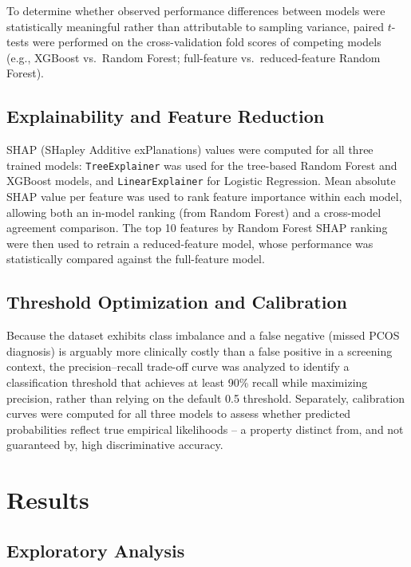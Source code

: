\documentclass[conference]{IEEEtran}
\begin{document}
To determine whether observed performance differences between models were statistically meaningful rather than attributable to sampling variance, paired $t$-tests were performed on the cross-validation fold scores of competing models (e.g., XGBoost vs.\ Random Forest; full-feature vs.\ reduced-feature Random Forest).

\subsection{Explainability and Feature Reduction}

SHAP (SHapley Additive exPlanations) values \cite{lundberg2017} were computed for all three trained models: \texttt{TreeExplainer} was used for the tree-based Random Forest and XGBoost models, and \texttt{LinearExplainer} for Logistic Regression. Mean absolute SHAP value per feature was used to rank feature importance within each model, allowing both an in-model ranking (from Random Forest) and a cross-model agreement comparison. The top 10 features by Random Forest SHAP ranking were then used to retrain a reduced-feature model, whose performance was statistically compared against the full-feature model.

\subsection{Threshold Optimization and Calibration}

Because the dataset exhibits class imbalance and a false negative (missed PCOS diagnosis) is arguably more clinically costly than a false positive in a screening context, the precision--recall trade-off curve was analyzed to identify a classification threshold that achieves at least 90\% recall while maximizing precision, rather than relying on the default 0.5 threshold. Separately, calibration curves were computed for all three models to assess whether predicted probabilities reflect true empirical likelihoods -- a property distinct from, and not guaranteed by, high discriminative accuracy.

\section{Results}

\subsection{Exploratory Analysis}
\end{document}
